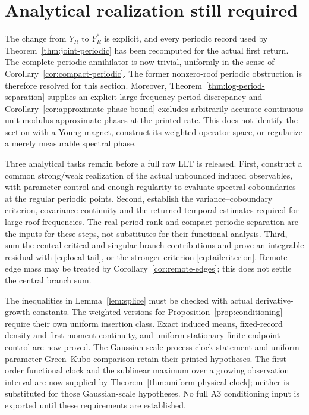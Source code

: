\section{Analytical realization still required}
The change from $Y_R$ to $Y_R^*$ is explicit, and every periodic record used
by Theorem~\ref{thm:joint-periodic} has been recomputed for the actual first
return. The complete periodic annihilator is now trivial, uniformly in the
sense of Corollary~\ref{cor:compact-periodic}. The former nonzero-roof
periodic obstruction is therefore resolved for this section. Moreover,
Theorem~\ref{thm:log-period-separation} supplies an explicit large-frequency
period discrepancy and Corollary~\ref{cor:approximate-phase-bound} excludes
arbitrarily accurate continuous unit-modulus approximate phases at the
printed rate. This does not identify the section with a Young magnet,
construct its weighted operator space, or regularize a merely measurable
spectral phase.

Three analytical tasks remain before a full raw LLT is released. First,
construct a common strong/weak realization of the actual unbounded induced
observables, with parameter control and enough regularity to evaluate
spectral coboundaries at the regular periodic points. Second, establish
the variance--coboundary criterion, covariance continuity and the returned
temporal estimates required for large roof frequencies. The real period
rank and compact periodic separation are the inputs for these steps, not
substitutes for their functional analysis. Third, sum the central critical
and singular branch contributions and prove an integrable residual with
\eqref{eq:local-tail}, or the stronger criterion \eqref{eq:tailcriterion}.
Remote edge mass may be treated by Corollary~\ref{cor:remote-edges}; this
does not settle the central branch sum.

The inequalities in Lemma~\ref{lem:splice} must be checked with actual
derivative-growth constants. The weighted versions for
Proposition~\ref{prop:conditioning} require their own uniform insertion
class. Exact induced means, fixed-record density and first-moment continuity,
and uniform stationary finite-endpoint control are now proved. The
Gaussian-scale process clock statement and uniform parameter Green--Kubo
comparison retain their printed hypotheses. The first-order functional
clock and the sublinear maximum over a growing observation interval are
now supplied by Theorem~\ref{thm:uniform-physical-clock}; neither is
substituted for those Gaussian-scale hypotheses. No full A3
conditioning input is exported until these requirements are established.

